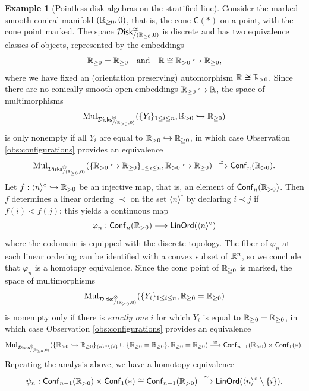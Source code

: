 \documentclass[10pt, reqno, twoside
, final
]{amsart}
\numberwithin{equation}{subsection}%
\theoremstyle{definition}
\theoremstyle{definition}
\theoremstyle{definition}
\theoremstyle{definition}
\theoremstyle{definition}
\theoremstyle{definition}
\theoremstyle{definition}
\theoremstyle{definition}
\theoremstyle{definition}
\theoremstyle{plain}
\theoremstyle{definition}
\theoremstyle{plain}
\theoremstyle{definition}
\theoremstyle{plain}
\theoremstyle{definition}
\theoremstyle{definition}
\theoremstyle{plain}
\theoremstyle{plain}
\theoremstyle{definition}
\newtheorem{ex}[defn]{Example}
\theoremstyle{plain}
\theoremstyle{plain}
\theoremstyle{plain}
\begin{document}
\begin{ex}[Pointless disk algebras on the stratified line]\label{ex:stratifiedline}
Consider the marked smooth conical manifold $(\mathbb{R}_{\geq 0},0)$, that is, the cone $\mathsf{C}(*)$ on a point, with the cone point marked. The space $\mathcal{D}\mathsf{isk}_{/(\mathbb{R}_{\geq 0},0)}^{\simeq}$ is discrete and has two equivalence classes of objects, represented by the embeddings
\[  \mathbb{R}_{\geq 0}=\mathbb{R}_{\geq 0}\quad\text{and}\quad \mathbb{R}\cong \mathbb{R}_{>0}\hookrightarrow \mathbb{R}_{\geq 0}, \]
where we have fixed an (orientation preserving) automorphism $\mathbb{R}\cong \mathbb{R}_{>0}$. Since there are no conically smooth open embeddings $\mathbb{R}_{\geq 0}\hookrightarrow \mathbb{R}$, the space of multimorphisms \[\mathrm{Mul}_{\mathcal{D}\mathsf{isks}^{\otimes}_{/(\mathbb{R}_{\geq 0},0)}}(\{Y_i\}_{1\leq i\leq n},\mathbb{R}_{>0}\hookrightarrow \mathbb{R}_{\geq 0})\]
is only nonempty if all $Y_i$ are equal to $\mathbb{R}_{>0}\hookrightarrow \mathbb{R}_{\geq 0}$, in which case Observation \ref{obs:configurations} provides an equivalence
\[ \mathrm{Mul}_{\mathcal{D}\mathsf{isks}^{\otimes}_{/(\mathbb{R}_{\geq 0},0)}}(\{\mathbb{R}_{>0}\hookrightarrow \mathbb{R}_{\geq 0}\}_{1\leq i\leq n},\mathbb{R}_{>0}\hookrightarrow \mathbb{R}_{\geq 0}) \overset{\simeq}{\longrightarrow} \mathsf{Conf}_n(\mathbb{R}_{>0}).  \]
Let $f:\langle n\rangle^{\circ}\hookrightarrow\mathbb{R}_{>0}$ be an injective map, that is, an element of $\mathsf{Conf}_n(\mathbb{R}_{>0})$. Then $f$ determines a linear ordering $\prec$ on the set $\langle n\rangle^{\circ}$ by declaring $i\prec j$ if $f(i)<f(j)$; this yields a continuous map
\[ \varphi_n:\mathsf{Conf}_n(\mathbb{R}_{>0}) \longrightarrow \mathsf{LinOrd}(\langle n\rangle^{\circ})\]
where the codomain is equipped with the discrete topology. The fiber of $\varphi_n$ at each linear ordering can be identified with a convex subset of $\mathbb{R}^n$, so we conclude that $\varphi_n$ is a homotopy equivalence. Since the cone point of $\mathbb{R}_{\geq 0}$ is marked, the space of multimorphisms 
\[\mathrm{Mul}_{\mathcal{D}\mathsf{isks}^{\otimes}_{/(\mathbb{R}_{\geq 0},0)}}(\{Y_i\}_{1\leq i\leq n},\mathbb{R}_{\geq 0}= \mathbb{R}_{\geq 0})\]
is nonempty only if there is \emph{exactly one} $i$ for which $Y_i$ is equal to $\mathbb{R}_{\geq 0}= \mathbb{R}_{\geq 0}$, in which case Observation \ref{obs:configurations} provides an equivalence
\[ \mathrm{Mul}_{\mathcal{D}\mathsf{isks}^{\otimes}_{/(\mathbb{R}_{\geq 0},0)}}(\{\mathbb{R}_{>0}\hookrightarrow \mathbb{R}_{\geq 0}\}_{\langle n\rangle^{\circ} \setminus \{i\}}\cup \{\mathbb{R}_{\geq 0}=\mathbb{R}_{\geq 0}\},\mathbb{R}_{\geq 0}=\mathbb{R}_{\geq 0}) \overset{\simeq}{\longrightarrow} \mathsf{Conf}_{n-1}(\mathbb{R}_{>0}) \times \mathsf{Conf}_1(*).  \]
Repeating the analysis above, we have a homotopy equivalence
\[ \psi_n: \mathsf{Conf}_{n-1}(\mathbb{R}_{>0})\times \mathsf{Conf}_1(*)  \cong \mathsf{Conf}_{n-1}(\mathbb{R}_{>0})\overset{\simeq}{\longrightarrow} \mathsf{LinOrd}(\langle n\rangle^{\circ}\setminus \{i\}). \]

\end{ex}
\end{document}

